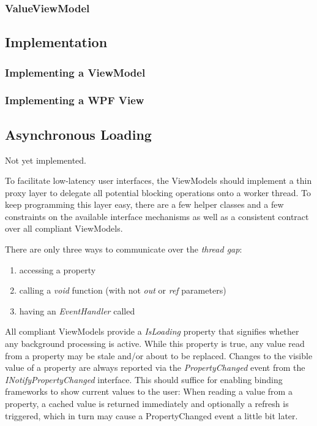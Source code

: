 \subsubsection{ValueViewModel}

\subsection{Implementation}

\subsubsection{Implementing a ViewModel}

\subsubsection{Implementing a WPF View}



\subsection{Asynchronous Loading}

\begin{note}
Not yet implemented.
\end{note}

To facilitate low-latency user interfaces, the ViewModels should implement a
thin proxy layer to delegate all potential blocking operations onto a worker
thread. To keep programming this layer easy, there are a few helper classes and
a few constraints on the available interface mechanisms as well as a consistent
contract over all compliant ViewModels.

There are only three ways to communicate over the \emph{thread gap}:
\begin{enumerate}
\item{accessing a property}
\item{calling a \emph{void} function (with not \emph{out} or \emph{ref} parameters)}
\item{having an \emph{EventHandler} called}
\end{enumerate}

All compliant ViewModels provide a \emph{IsLoading} property that signifies
whether any background processing is active. While this property is true, any
value read from a property may be stale and/or about to be replaced. Changes to
the visible value of a property are always reported via the
\emph{PropertyChanged} event from the \emph{INotifyPropertyChanged} interface.
This should suffice for enabling binding frameworks to show current values to
the user: When reading a value from a property, a cached value is returned
immediately and optionally a refresh is triggered, which in turn may cause a
PropertyChanged event a little bit later.

